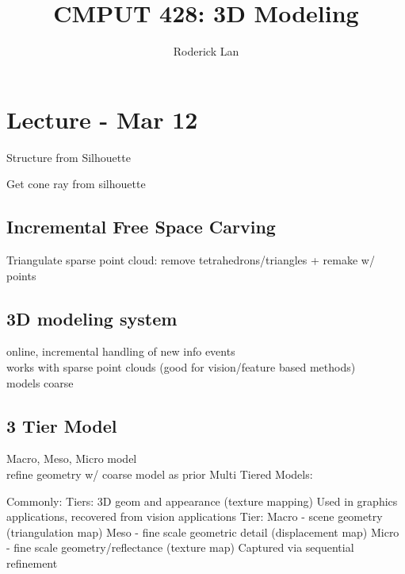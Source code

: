 \documentclass{article}
\title{CMPUT 428: 3D Modeling}
\author{Roderick Lan}
\date{}
\begin{document}
\makeatother
{}

\maketitle
\tableofcontents
\break

\section{Lecture - Mar 12}
Structure from Silhouette
\begin{list}{}{}
  \item Get cone ray from silhouette
\end{list}

\subsection{Incremental Free Space Carving}
Triangulate sparse point cloud: remove tetrahedrons/triangles + remake w/ points

\subsection{3D modeling system}
online, incremental handling of new info events
\\
works with sparse point clouds (good for vision/feature based methods)
\\
models coarse


\subsection{3 Tier Model}
Macro, Meso, Micro model
\\
refine geometry w/ coarse model as prior
\noindent
Multi Tiered Models:
\begin{outline}
  \1 Commonly:
     Tiers: 3D geom and appearance (texture mapping)
    \2 Used in graphics applications, recovered from vision applications
   Tier:
    \2 Macro - scene geometry (triangulation map)
    \2 Meso - fine scale geometric detail (displacement map)
    \3 Micro - fine scale geometry/reflectance (texture map)
  \1 Captured via sequential refinement
\end{outline}
\end{document}
